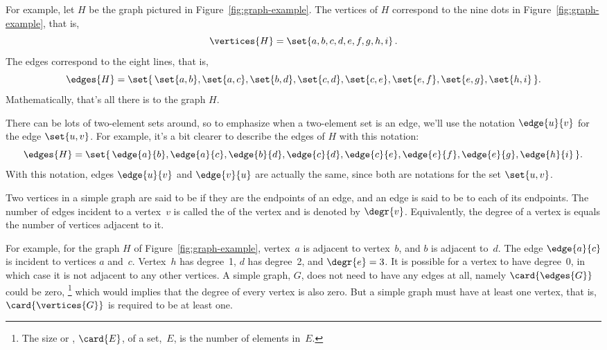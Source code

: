 For example, let $H$ be the graph pictured in
Figure~\ref{fig:graph-example}.  The vertices of $H$ correspond to the
nine dots in Figure~\ref{fig:graph-example}, that is,
\[
\vertices{H} =  \set{a, b, c, d, e, f, g, h, i}\, .
\]
The edges correspond to the eight lines, that is,
\[
\edges{H} =  \set{\, \set{a, b}, \set{a, c}, \set{b, d}, \set{c, d},
              \set{c, e}, \set{e, f}, \set{e, g}, \set{h, i} \,}.
\]
Mathematically, that's all there is to the graph $H$.
\begin{editingnotes}
\textcolor{red}{CUT by ARM}: So this $H$ has 9~nodes and 8~edges.}
\end{editingnotes}

 There can be lots of two-element
sets around, so to emphasize when a two-element set is an edge, we'll
use the notation $\edge{u}{v}$ for the edge $\set{u,v}$.  For example,
it's a bit clearer to describe the edges of $H$ with this notation:
\[
\edges{H} =  \set{\, \edge{a}{b}, \edge{a}{c}, \edge{b}{d}, \edge{c}{d},
              \edge{c}{e}, \edge{e}{f}, \edge{e}{g}, \edge{h}{i} \,}.
\]
With this notation, edges $\edge{u}{v}$ and $\edge{v}{u}$ are actually the
same, since both are notations for the set $\set{u,v}$.

\begin{editingnotes}
\textcolor{red}{CUT by ARM}: Note that $\edge{a}{b}$
  and $\edge{b}{a}$ are different descriptions of the same edge, since
  sets are unordered.}

\end{editingnotes}
\begin{definition}
Two vertices in a simple graph are said to be  if they
 are the endpoints of an edge, and an edge is
said to be  to each of its endpoints.  The number of
edges incident to a vertex~$v$ is called the  of the
vertex and is denoted by $\degr{v}$.  Equivalently, the degree of a
vertex is equals the number of vertices adjacent to it.
\end{definition}
For example, for the graph $H$ of Figure~\ref{fig:graph-example},
vertex~$a$ is adjacent to vertex~$b$, and $b$ is adjacent to~$d$.  The
edge $\edge{a}{c}$ is incident to vertices $a$ and~$c$.  Vertex~$h$
has degree~1, $d$ has degree~2, and $\degr{e} = 3$.  It is possible
for a vertex to have degree~0, in which case it is not adjacent to any
other vertices.  A simple graph, $G$, does not need to have any edges
at all, namely $\card{\edges{G}}$ could be zero,
\footnote{The size or , $\card{E}$, of a set,~$E$,
  is the number of elements in~$E$.}  which would implies that the
degree of every vertex is also zero.  But a simple graph must have at
least one vertex, that is, $\card{\vertices{G}}$ is required to be at
least one.

